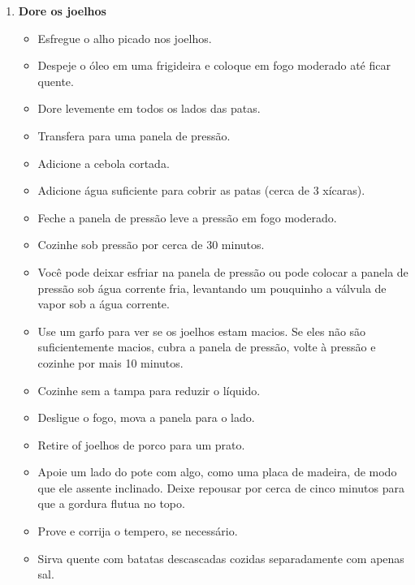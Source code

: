 \documentclass [11pt, letterpaper] {article}
\begin{document}
\begin {description}
\begin {enumerate}
\item {\bf Dore os joelhos}
\begin {itemize}
\item Esfregue o alho picado nos joelhos.
\item Despeje o óleo em uma frigideira e coloque em fogo moderado até ficar quente.
\item Dore levemente em todos os lados das patas.
\item Transfera para uma panela de pressão.
\item Adicione a cebola cortada.
\item Adicione água suficiente para cobrir as patas (cerca de 3 xícaras).
\item Feche a panela de pressão leve a pressão em fogo moderado.
\item Cozinhe sob pressão por cerca de 30 minutos.
\item Você pode deixar esfriar na panela de pressão ou pode colocar a panela de pressão sob água corrente fria, levantando um pouquinho a válvula de vapor sob a água corrente.
\item Use um garfo para ver se os joelhos estam macios. Se eles não são suficientemente macios, cubra a panela de pressão, volte \`a press\~ao e cozinhe por mais 10 minutos.
\item Cozinhe sem a tampa para reduzir o líquido.
\item Desligue o fogo, mova a panela para o lado.
\item Retire of joelhos de porco para um prato.
\item Apoie um lado do pote com algo, como uma placa de madeira, de modo que ele assente inclinado. Deixe repousar por cerca de cinco minutos para que a gordura flutua no topo.
\item Prove e corrija o tempero, se necessário.
\item Sirva quente com batatas descascadas cozidas separadamente com apenas sal.
\end {itemize}
\end {enumerate}
\end {description}
\end{document}
